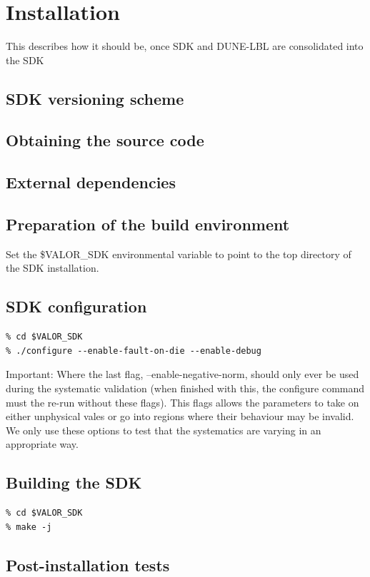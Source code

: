 

\section{Installation}

{\color{red} This describes how it should be, once SDK and DUNE-LBL are consolidated into the SDK}

\subsection{SDK versioning scheme}

\subsection{Obtaining the source code}

\subsection{External dependencies}

\subsection{Preparation of the build environment}

Set the \$VALOR\_SDK environmental variable to point to the top directory of the SDK installation.

\subsection{SDK configuration}

\begin{verbatim}
% cd $VALOR_SDK
% ./configure --enable-fault-on-die --enable-debug
\end{verbatim}

Important: Where the last flag, --enable-negative-norm, should only ever be used during the systematic validation (when finished with this, the configure command must the re-run without these flags). This flags allows the parameters to take on either unphysical vales or go into regions where their behaviour may be invalid. We only use these options to test that the systematics are varying in an appropriate way.

\subsection{Building the SDK}

\begin{verbatim}
% cd $VALOR_SDK
% make -j
\end{verbatim}

\subsection{Post-installation tests}

